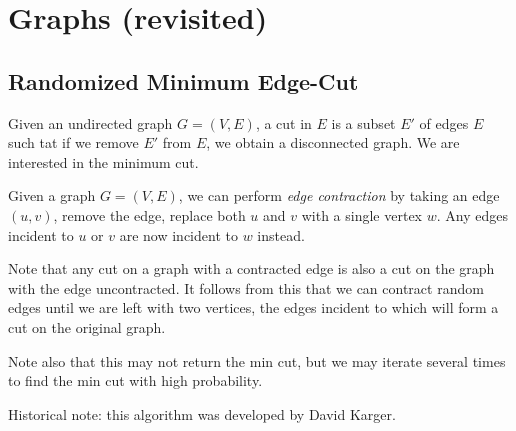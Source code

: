 \chapter{Graphs (revisited)}

\section{Randomized Minimum Edge-Cut}

Given an undirected graph $G = (V,E)$, a cut in $E$ is a subset $E'$
of edges $E$ such tat if we remove $E'$ from $E$, we obtain a
disconnected graph.  We are interested in the minimum cut.

Given a graph $G = (V,E)$, we can perform \emph{edge contraction} by
taking an edge $(u,v)$, remove the edge, replace both $u$ and $v$ with
a single vertex $w$.  Any edges incident to $u$ or $v$ are now
incident to $w$ instead.

Note that any cut on a graph with a contracted edge is also a cut on
the graph with the edge uncontracted.  It follows from this that we
can contract random edges until we are left with two vertices, the
edges incident to which will form a cut on the original graph.

Note also that this may not return the min cut, but we may iterate
several times to find the min cut with high probability.

Historical note: this algorithm was developed by David Karger.
